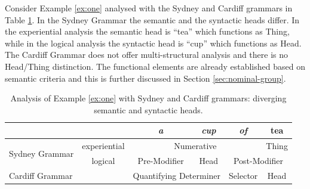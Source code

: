 %
%

Consider Example \ref{ex:one} analysed with the Sydney and Cardiff grammars in Table \ref{tab:the-head-differences}. In the Sydney Grammar the semantic and the syntactic heads differ. In the experiential analysis the semantic head is ``tea'' which functions as Thing, while in the logical analysis the syntactic head is ``cup'' which functions as Head. The Cardiff Grammar does not offer multi-structural analysis and there is no Head/Thing distinction. The functional elements are already established based on semantic criteria and this is further discussed in Section \ref{sec:nominal-group}. 

\begin{table}[!ht]
	\centering
	\begin{tabular}{|c|c|c|c|c|c|}
        \hline
        \multicolumn{2}{|c|}{\textit{}}                 & \textit{a}           & \textit{cup}         & \textit{of}         & tea          \\ \hline
        \multirow{2}{*}{Sydney Grammar} & experiential  & \multicolumn{3}{c|}{Numerative}                                   & Thing        \\ \cline{2-6} 
        & logical & Pre-Modifier         & Head                 & \multicolumn{2}{c|}{Post-Modifier} \\ \hline
        \multicolumn{2}{|l|}{Cardiff Grammar}           & \multicolumn{2}{c|}{Quantifying Determiner} & Selector            & Head         \\ \hline
    \end{tabular}
	\caption{Analysis of Example \ref{ex:one} with Sydney and Cardiff grammars: diverging semantic and syntactic heads.}
	\label{tab:the-head-differences}
\end{table}


